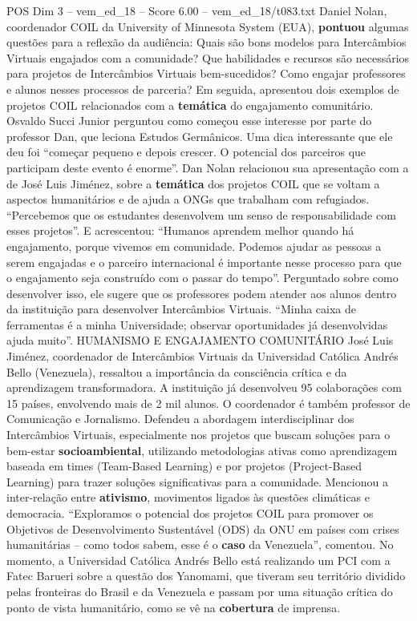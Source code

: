 \begin{textsample}{POS Dim 3 – vem\_ed\_18 – Score 6.00 – vem\_ed\_18/t083.txt}  \label{ex:f3_pos_133}
Daniel Nolan, coordenador COIL da University of Minnesota System (EUA), \textbf{pontuou} algumas questões para a reflexão da audiência: Quais são bons modelos para Intercâmbios Virtuais engajados com a comunidade?
Que habilidades e recursos são necessários para projetos de Intercâmbios Virtuais bem-sucedidos?
Como engajar professores e alunos nesses processos de parceria?
Em seguida, apresentou dois exemplos de projetos COIL relacionados com a \textbf{temática} do engajamento comunitário.
Osvaldo Succi Junior perguntou como começou esse interesse por parte do professor Dan, que leciona Estudos Germânicos.
Uma dica interessante que ele deu foi “começar pequeno e depois crescer.
O potencial dos parceiros que participam deste evento é enorme”.
Dan Nolan relacionou sua apresentação com a de José Luis Jiménez, sobre a \textbf{temática} dos projetos COIL que se voltam a aspectos humanitários e de ajuda a ONGs que trabalham com refugiados. “Percebemos que os estudantes desenvolvem um senso de responsabilidade com esses projetos”.
E acrescentou: “Humanos aprendem melhor quando há engajamento, porque vivemos em comunidade.
Podemos ajudar as pessoas a serem engajadas e o parceiro internacional é importante nesse processo para que o engajamento seja construído com o passar do tempo”.
Perguntado sobre como desenvolver isso, ele sugere que os professores podem atender aos alunos dentro da instituição para desenvolver Intercâmbios Virtuais. “Minha caixa de ferramentas é a minha Universidade; observar oportunidades já desenvolvidas ajuda muito”.
HUMANISMO E ENGAJAMENTO COMUNITÁRIO José Luis Jiménez, coordenador de Intercâmbios Virtuais da Universidad Católica Andrés Bello (Venezuela), ressaltou a importância da consciência crítica e da aprendizagem transformadora.
A instituição já desenvolveu 95 colaborações com 15 países, envolvendo mais de 2 mil alunos.
O coordenador é também professor de Comunicação e Jornalismo.
Defendeu a abordagem interdisciplinar dos Intercâmbios Virtuais, especialmente nos projetos que buscam soluções para o bem-estar \textbf{socioambiental}, utilizando metodologias ativas como aprendizagem baseada em times (Team-Based Learning) e por projetos (Project-Based Learning) para trazer soluções significativas para a comunidade.
Mencionou a inter-relação entre \textbf{ativismo}, movimentos ligados às questões climáticas e democracia. “Exploramos o potencial dos projetos COIL para promover os Objetivos de Desenvolvimento Sustentável (ODS) da ONU em países com crises humanitárias – como todos sabem, esse é o \textbf{caso} da Venezuela”, comentou.
No momento, a Universidad Católica Andrés Bello está realizando um PCI com a Fatec Barueri sobre a questão dos Yanomami, que tiveram seu território dividido pelas fronteiras do Brasil e da Venezuela e passam por uma situação crítica do ponto de vista humanitário, como se vê na \textbf{cobertura} de imprensa.

\end{textsample}
